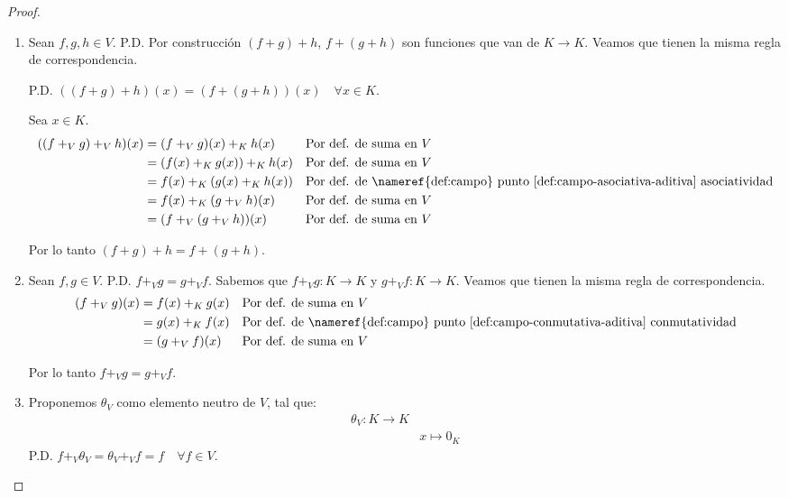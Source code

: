\begin{proof}
    

    \begin{enumerate}
        \item Sean $f,g,h \in V$. P.D. 
        Por construcción $(f+g)+h$, $f+(g+h)$ son funciones que van de $K \rightarrow K$. Veamos que tienen la misma regla de correspondencia.
        
        P.D. $((f+g)+h)(x) = (f+(g+h))(x) \quad \forall x \in K$.
    
        Sea $x \in K$.
        \begin{align*}
            ((f+_V g)+_V h)(x) &= (f+_V g)(x) +_K h(x) && \text{Por def. de suma en $V$} \\
            &= (f(x) +_K g(x)) +_K h(x) && \text{Por def. de suma en $V$} \\
            &= f(x) +_K (g(x) +_K h(x)) && \text{Por def. de \nameref{def:campo} punto \ref{def:campo-asociativa-aditiva} asociatividad} \\
            &= f(x) +_K (g+_V h)(x) && \text{Por def. de suma en $V$} \\
            &= (f+_V (g+_V h))(x) && \text{Por def. de suma en $V$}
        \end{align*}
        
        Por lo tanto $(f+g)+h = f+(g+h)$.


        \item Sean $f,g \in V$. P.D. $f +_V g = g +_V f$.
        Sabemos que $f +_V g: K \rightarrow K$ y $g +_V f: K \rightarrow K$. Veamos que tienen la misma regla de correspondencia.
        \begin{align*}
            (f +_V g)(x) &= f(x) +_K g(x) && \text{Por def. de suma en $V$} \\
            &= g(x) +_K f(x) && \text{Por def. de \nameref{def:campo} punto \ref{def:campo-conmutativa-aditiva} conmutatividad} \\
            &= (g +_V f)(x) && \text{Por def. de suma en $V$}
        \end{align*}
    
        Por lo tanto $f +_V g = g +_V f$.


        \item  Proponemos $\theta_V$ como elemento neutro de $V$, tal que: 
        \begin{align*}
            \theta_V: K \rightarrow K \\
            &x \mapsto 0_K
        \end{align*}
        P.D. $f +_V \theta_V = \theta_V +_V f = f \quad \forall f \in V$.
    

\end{enumerate}
\end{proof}
